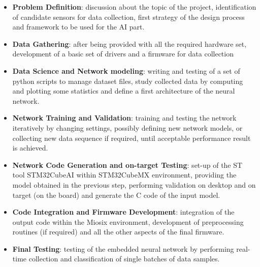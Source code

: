 \begin{itemize}
	\item \textbf{Problem Definition}: discussion about the topic of the project, identification of candidate sensors for data collection, first strategy of the design process and framework to be used for the AI part.
	\item \textbf{Data Gathering}: after being provided with all the required hardware set, development of a basic set of drivers and a firmware for data collection
	\item \textbf{Data Science and Network modeling}: writing and testing of a set of python scripts to manage dataset files, study collected data by computing and plotting some statistics and define a first architecture of the neural network.
	\item \textbf{Network Training and Validation}: training and testing the network iteratively by changing settings, possibly defining new network models, or collecting new data sequence if required, until acceptable performance result is achieved.
	\item \textbf{Network Code Generation and on-target Testing}: set-up of the ST tool STM32CubeAI within STM32CubeMX environment, providing the model obtained in the previous step, performing validation on desktop and on target (on the board) and generate the C code of the input model.
	\item \textbf{Code Integration and Firmware Development}: integration of the output code within the Miosix environment, development of preprocessing routines (if required) and all the other aspects of the final firmware.
	\item \textbf{Final Testing}: testing of the embedded neural network by performing real-time collection and classification of single batches of data samples. 
\end{itemize}
\newpage

